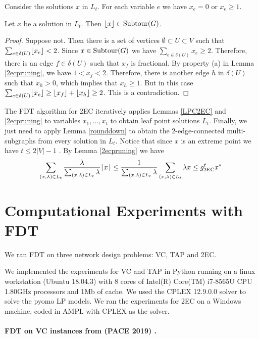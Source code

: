 Consider the solutions $x$ in $L_t$. For each variable $e$ we have $x_e=0$ or $x_e\geq 1$. 
\begin{lemma}\label{rounddown}
	Let $x$ be a solution in $L_t$. Then $\lfloor x\rfloor \in \operatorname{{Subtour}}(G)$. 
\end{lemma}
\begin{proof}
	Suppose not. Then there is a set of vertices $\emptyset \subset U \subset V$ such that $\sum_{e\in \delta(U)}\lfloor x_e\rfloor<2$. Since $x\in \operatorname{{Subtour}}(G)$ we have $\sum_{e\in \delta(U)}x_e \geq 2$. Therefore, there is an edge $f\in \delta(U)$ such that $x_f$ is fractional. By property (a) in Lemma \ref{2ecpruning}, we have $1<  x_f < 2$. Therefore, there is another edge $h$ in $\delta(U)$ such that $x_h>0$, which implies that $x_h\geq 1$. But in this case $\sum_{e\in \delta(U)}\lfloor x_e\rfloor\geq  \lfloor x_f\rfloor+\lfloor x_h\rfloor  \geq 2$. This is a contradiction.
\end{proof}

The FDT algorithm for 2EC iteratively applies Lemmas \ref{LPC2EC} and \ref{2ecpruning} to variables $x_1,\ldots,x_t$ to obtain leaf point solutions $L_t$. Finally, we just need to apply Lemma \ref{rounddown} to obtain the 2-edge-connected multi-subgraphs from every solution in $L_t$. Notice that since $x$ is an extreme point we have $t\leq 2|V|-1$ \cite{boydpulley}. By Lemma \ref{2ecpruning} we have
\begin{align*}
\sum_{(x,\lambda)\in L_t} \frac{\lambda}{\sum_{(x,\lambda)\in L_t}\lambda} \floor{x} \leq \frac{1}{\sum_{(x,\lambda)\in L_t}\lambda} \sum_{(x,\lambda)\in L_t} \lambda {x} \leq g^t_{\2ec} x^*.
\end{align*}
\section{Computational Experiments with FDT}\label{sec:experiment}
We ran FDT on three network design problems: VC, TAP and 2EC. 

We implemented the experiments for VC and TAP in Python running on a linux workstation (Ubuntu 18.04.3) with 8 cores of Intel(R) Core(TM) i7-8565U CPU  1.80GHz processors and 1Mb of cache. We used the CPLEX 12.9.0.0 solver to solve the pyomo LP models. We ran the experiments for 2EC on a Windows machine, coded in AMPL with CPLEX as the solver.
\paragraph{FDT on VC instances from (PACE 2019) \cite{PACE}.}


